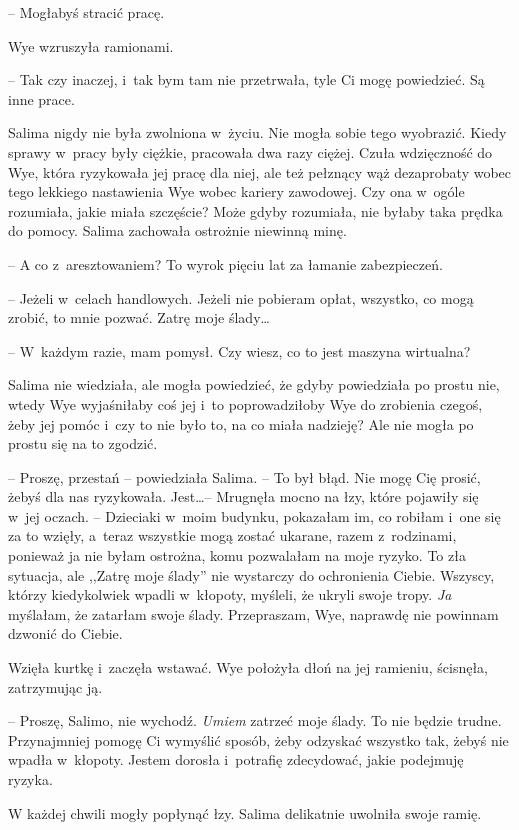 \documentclass[oneside,polish,11pt,sfheadings]{mwbk}
\begin{document}
-- Mogłabyś stracić pracę.

Wye wzruszyła ramionami. 

-- Tak czy inaczej, i~tak bym tam nie
przetrwała, tyle Ci mogę powiedzieć. Są inne prace.

Salima nigdy nie była zwolniona w~życiu. Nie mogła sobie tego wyobrazić.
Kiedy sprawy w~pracy były ciężkie, pracowała dwa razy ciężej. Czuła
wdzięczność do Wye, która ryzykowała jej pracę dla niej, ale też
pełznący wąż dezaprobaty wobec tego lekkiego nastawienia Wye wobec
kariery zawodowej. Czy ona w~ogóle rozumiała, jakie miała szczęście?
Może gdyby rozumiała, nie byłaby taka prędka do pomocy. Salima zachowała
ostrożnie niewinną minę.

-- A co z~aresztowaniem? To wyrok pięciu lat za łamanie zabezpieczeń.

-- Jeżeli w~celach handlowych. Jeżeli nie pobieram opłat, wszystko, co
mogą zrobić, to mnie pozwać. Zatrę moje ślady\ldots 

-- W~każdym razie, mam pomysł. Czy wiesz, co to jest maszyna wirtualna?

Salima nie wiedziała, ale mogła powiedzieć, że gdyby powiedziała po
prostu nie, wtedy Wye wyjaśniłaby coś jej i~to poprowadziłoby Wye do
zrobienia czegoś, żeby jej pomóc i~czy to nie było to, na co miała
nadzieję? Ale nie mogła po prostu się na to zgodzić.

-- Proszę, przestań -- powiedziała Salima. -- To był błąd. Nie mogę Cię
prosić, żebyś dla nas ryzykowała. Jest\ldots  -- Mrugnęła mocno na łzy, które
pojawiły się w~jej oczach. -- Dzieciaki w~moim budynku, pokazałam im, co
robiłam i~one się za to wzięły, a~teraz wszystkie mogą zostać ukarane,
razem z~rodzinami, ponieważ ja nie byłam ostrożna, komu pozwalałam na
moje ryzyko. To zła sytuacja, ale ,,Zatrę moje ślady'' nie wystarczy do
ochronienia Ciebie. Wszyscy, którzy kiedykolwiek wpadli w~kłopoty,
myśleli, że ukryli swoje tropy. \textit{Ja} myślałam, że zatarłam swoje
ślady. Przepraszam, Wye, naprawdę nie powinnam dzwonić do Ciebie.

Wzięła kurtkę i~zaczęła wstawać. Wye położyła dłoń na jej ramieniu,
ścisnęła, zatrzymując ją. 

-- Proszę, Salimo, nie wychodź. \textit{Umiem}
zatrzeć moje ślady. To nie będzie trudne. Przynajmniej pomogę Ci
wymyślić sposób, żeby odzyskać wszystko tak, żebyś nie wpadła w~kłopoty.
Jestem dorosła i~potrafię zdecydować, jakie podejmuję ryzyka.

W każdej chwili mogły popłynąć łzy. Salima delikatnie uwolniła swoje
ramię. 
\end{document}
